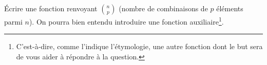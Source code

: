 \question Écrire une fonction  renvoyant
  $\displaystyle\binom{n}{p}$ (nombre de combinaisons de $p$ éléments parmi
  $n$). On pourra bien entendu introduire une fonction 
  auxiliaire\footnote{C'est-à-dire, comme l'indique l'étymologie, une
    autre fonction dont le but sera de vous aider à répondre à la question.}.